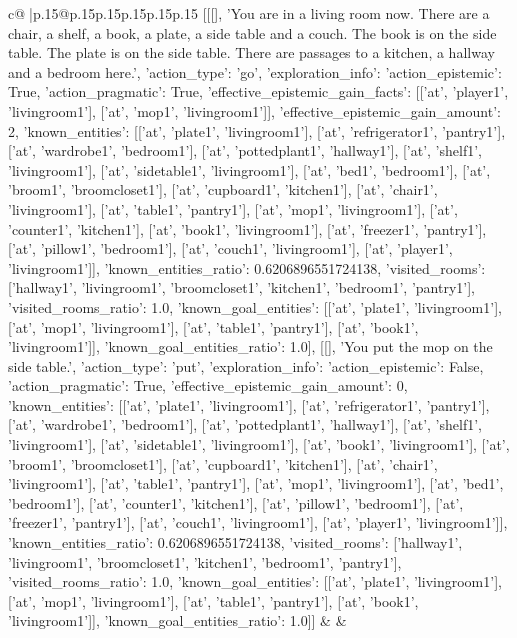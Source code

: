 \documentclass{article}
\begin{document}
{\begin{supertabular}{c@{$\;$}|p{.15\linewidth}@{}p{.15\linewidth}p{.15\linewidth}p{.15\linewidth}p{.15\linewidth}p{.15\linewidth}}
{{{	 [[[], 'You are in a living room now. There are a chair, a shelf, a book, a plate, a side table and a couch. The book is on the side table. The plate is on the side table. There are passages to a kitchen, a hallway and a bedroom here.', {'action_type': 'go', 'exploration_info': {'action_epistemic': True, 'action_pragmatic': True, 'effective_epistemic_gain_facts': [['at', 'player1', 'livingroom1'], ['at', 'mop1', 'livingroom1']], 'effective_epistemic_gain_amount': 2, 'known_entities': [['at', 'plate1', 'livingroom1'], ['at', 'refrigerator1', 'pantry1'], ['at', 'wardrobe1', 'bedroom1'], ['at', 'pottedplant1', 'hallway1'], ['at', 'shelf1', 'livingroom1'], ['at', 'sidetable1', 'livingroom1'], ['at', 'bed1', 'bedroom1'], ['at', 'broom1', 'broomcloset1'], ['at', 'cupboard1', 'kitchen1'], ['at', 'chair1', 'livingroom1'], ['at', 'table1', 'pantry1'], ['at', 'mop1', 'livingroom1'], ['at', 'counter1', 'kitchen1'], ['at', 'book1', 'livingroom1'], ['at', 'freezer1', 'pantry1'], ['at', 'pillow1', 'bedroom1'], ['at', 'couch1', 'livingroom1'], ['at', 'player1', 'livingroom1']], 'known_entities_ratio': 0.6206896551724138, 'visited_rooms': ['hallway1', 'livingroom1', 'broomcloset1', 'kitchen1', 'bedroom1', 'pantry1'], 'visited_rooms_ratio': 1.0, 'known_goal_entities': [['at', 'plate1', 'livingroom1'], ['at', 'mop1', 'livingroom1'], ['at', 'table1', 'pantry1'], ['at', 'book1', 'livingroom1']], 'known_goal_entities_ratio': 1.0}}], [[], 'You put the mop on the side table.', {'action_type': 'put', 'exploration_info': {'action_epistemic': False, 'action_pragmatic': True, 'effective_epistemic_gain_amount': 0, 'known_entities': [['at', 'plate1', 'livingroom1'], ['at', 'refrigerator1', 'pantry1'], ['at', 'wardrobe1', 'bedroom1'], ['at', 'pottedplant1', 'hallway1'], ['at', 'shelf1', 'livingroom1'], ['at', 'sidetable1', 'livingroom1'], ['at', 'book1', 'livingroom1'], ['at', 'broom1', 'broomcloset1'], ['at', 'cupboard1', 'kitchen1'], ['at', 'chair1', 'livingroom1'], ['at', 'table1', 'pantry1'], ['at', 'mop1', 'livingroom1'], ['at', 'bed1', 'bedroom1'], ['at', 'counter1', 'kitchen1'], ['at', 'pillow1', 'bedroom1'], ['at', 'freezer1', 'pantry1'], ['at', 'couch1', 'livingroom1'], ['at', 'player1', 'livingroom1']], 'known_entities_ratio': 0.6206896551724138, 'visited_rooms': ['hallway1', 'livingroom1', 'broomcloset1', 'kitchen1', 'bedroom1', 'pantry1'], 'visited_rooms_ratio': 1.0, 'known_goal_entities': [['at', 'plate1', 'livingroom1'], ['at', 'mop1', 'livingroom1'], ['at', 'table1', 'pantry1'], ['at', 'book1', 'livingroom1']], 'known_goal_entities_ratio': 1.0}}]] 
	  } 
	   } 
	   } 
	 & & \\ 
 


\end{supertabular}}
\end{document}
